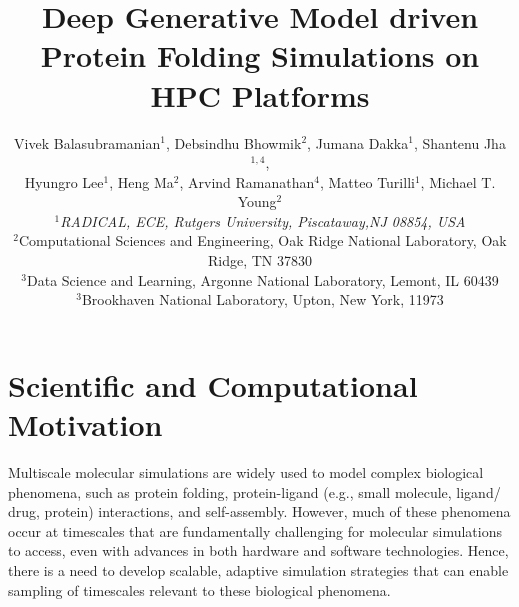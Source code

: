 \documentclass[conference,final]{IEEEtran}
\begin{document}
\title{Deep Generative Model driven Protein Folding Simulations on HPC Platforms}
\author{Vivek Balasubramanian$^{1}$, Debsindhu Bhowmik$^{2}$, Jumana Dakka$^{1}$, Shantenu Jha$^{1,4}$, \\ Hyungro Lee$^{1}$, Heng Ma$^{2}$, Arvind Ramanathan$^{4}$, Matteo Turilli$^{1}$, Michael T. Young$^{2}$ \\
   {\footnotesize{\emph{$^{1}$RADICAL, ECE, Rutgers University, Piscataway,NJ 08854, USA}}}\\
   \footnotesize{\emph{$^{2}$}}Computational Sciences and Engineering, Oak Ridge National Laboratory, Oak Ridge, TN 37830\\
   \footnotesize{\emph{$^{3}$}}Data Science and Learning, Argonne National Laboratory, Lemont, IL 60439\\
   \footnotesize{\emph{$^{3}$}}Brookhaven National Laboratory, Upton, New York, 11973\\
   }


\date{}
\maketitle

\section{Scientific  and Computational Motivation}

Multiscale molecular simulations are widely used to model complex biological phenomena, such as protein folding, protein-ligand (e.g., small molecule, ligand/ drug, protein) interactions, and self-assembly. However, much of these phenomena occur at timescales that are fundamentally challenging for molecular simulations to access, even with advances in both hardware and software technologies. Hence, there is a need to develop scalable, adaptive simulation strategies that can enable sampling of timescales relevant to these biological phenomena. 
\end{document}
